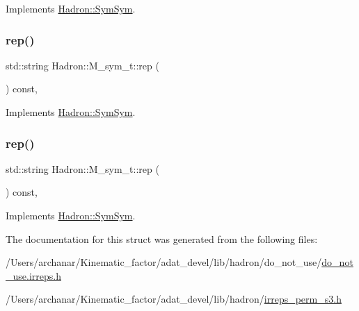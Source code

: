 Implements \mbox{\hyperlink{structHadron_1_1SymSym_aa6e588740862036933a9efe085a5e5e5}{Hadron\+::\+Sym\+Sym}}.

\mbox{\label{structHadron_1_1M__sym__t_ad90bc816709bb65ec3e0b804090fbefe}} 
\subsubsection{\texorpdfstring{rep()}{rep()}\hspace{0.1cm}{\footnotesize\ttfamily [2/3]}}
{\footnotesize\ttfamily std\+::string Hadron\+::\+M\+\_\+sym\+\_\+t\+::rep (\begin{DoxyParamCaption}{ }\end{DoxyParamCaption}) const\hspace{0.3cm}{\ttfamily [inline]}, {\ttfamily [virtual]}}



Implements \mbox{\hyperlink{structHadron_1_1SymSym_aa6e588740862036933a9efe085a5e5e5}{Hadron\+::\+Sym\+Sym}}.

\mbox{\label{structHadron_1_1M__sym__t_ad90bc816709bb65ec3e0b804090fbefe}} 
\subsubsection{\texorpdfstring{rep()}{rep()}\hspace{0.1cm}{\footnotesize\ttfamily [3/3]}}
{\footnotesize\ttfamily std\+::string Hadron\+::\+M\+\_\+sym\+\_\+t\+::rep (\begin{DoxyParamCaption}{ }\end{DoxyParamCaption}) const\hspace{0.3cm}{\ttfamily [inline]}, {\ttfamily [virtual]}}



Implements \mbox{\hyperlink{structHadron_1_1SymSym_aa6e588740862036933a9efe085a5e5e5}{Hadron\+::\+Sym\+Sym}}.



The documentation for this struct was generated from the following files\+:\begin{DoxyCompactItemize}
\item 
/\+Users/archanar/\+Kinematic\+\_\+factor/adat\+\_\+devel/lib/hadron/do\+\_\+not\+\_\+use/\mbox{\hyperlink{do__not__use_8irreps_8h}{do\+\_\+not\+\_\+use.\+irreps.\+h}}\item 
/\+Users/archanar/\+Kinematic\+\_\+factor/adat\+\_\+devel/lib/hadron/\mbox{\hyperlink{lib_2hadron_2irreps__perm__s3_8h}{irreps\+\_\+perm\+\_\+s3.\+h}}\end{DoxyCompactItemize}
